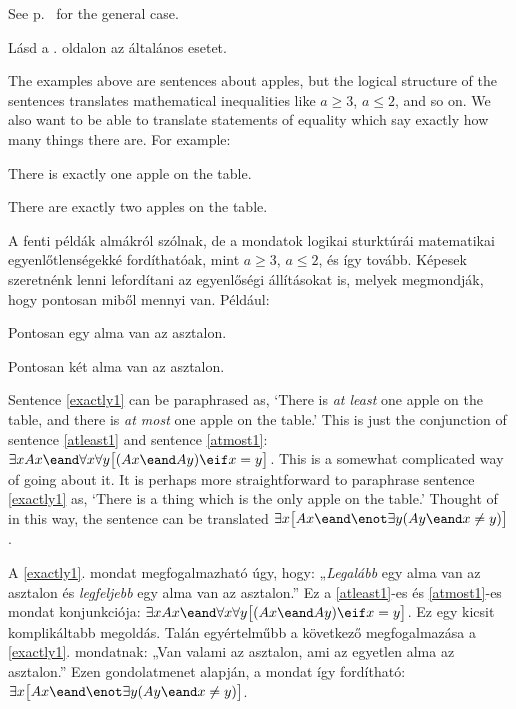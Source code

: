 See p.~\pageref{summary.atmost} for the general case.

Lásd a \pageref{summary.atmost}. oldalon az általános esetet.

The examples above are sentences about apples, but the logical structure of the sentences translates mathematical inequalities like $a\geq 3$, $a \leq 2$, and so on. We also want to be able to translate statements of equality which say exactly how many things there are. For example:
\begin{earg}
\item[\ex{exactly1}] There is exactly one apple on the table.
\item[\ex{exactly2}] There are exactly two apples on the table.
\end{earg}

A fenti példák almákról szólnak, de a mondatok logikai sturktúrái matematikai egyenlőtlenségekké fordíthatóak, mint $a\geqslant 3$, $a \leqslant 2$, és így tovább. Képesek szeretnénk lenni lefordítani az egyenlőségi állításokat is, melyek megmondják, hogy pontosan miből mennyi van. Például:
\begin{earg}
\item[\ex{exactly1}] Pontosan egy alma van az asztalon.
\item[\ex{exactly2}] Pontosan két alma van az asztalon.
\end{earg}

Sentence \ref{exactly1} can be paraphrased as, `There is \emph{at least} one apple on the table, and there is \emph{at most} one apple on the table.' This is just the conjunction of sentence \ref{atleast1} and sentence \ref{atmost1}: $\exists x Ax \eand \forall x\forall y\bigl[(Ax \eand Ay) \eif x=y\bigr]$. This is a somewhat complicated way of going about it. It is perhaps more straightforward to paraphrase sentence \ref{exactly1} as, `There is a thing which is the only apple on the table.' Thought of in this way, the sentence can be translated $\exists x\bigl[Ax \eand \enot\exists y(Ay \eand x\neq y)\bigr]$.

A \ref{exactly1}. mondat megfogalmazható úgy, hogy: „\emph{Legalább} egy alma van az asztalon és \emph{legfeljebb} egy alma van az asztalon.” Ez a \ref{atleast1}-es és \ref{atmost1}-es mondat konjunkciója: $\exists x Ax \eand \forall x\forall y\bigl[(Ax \eand Ay) \eif x=y\bigr]$. Ez egy kicsit komplikáltabb megoldás. Talán egyértelműbb a következő megfogalmazása a \ref{exactly1}. mondatnak: „Van valami az asztalon, ami az egyetlen alma az asztalon.” Ezen gondolatmenet alapján, a mondat így fordítható: $\exists x\bigl[Ax \eand \enot\exists y(Ay \eand x\neq y)\bigr]$.

